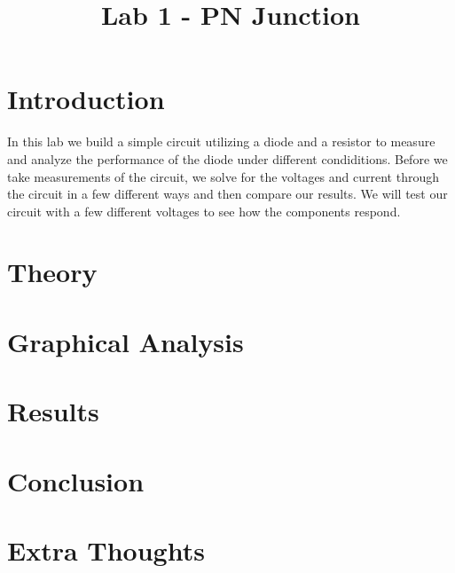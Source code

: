 \documentclass{article}
\title{Lab 1 - PN Junction}
\begin{document}
\maketitle
\section{Introduction}

In this lab we build a simple circuit utilizing a diode
and a resistor to measure and analyze the performance
of the diode under different condiditions. Before we
take measurements of the circuit, we solve for the voltages
and current through the circuit in a few different ways and
then compare our results. We will test our circuit with
a few different voltages to see how the components respond.

\section{Theory}

\section{Graphical Analysis}

\section{Results}

\section{Conclusion}

\section{Extra Thoughts}
\end{document}
